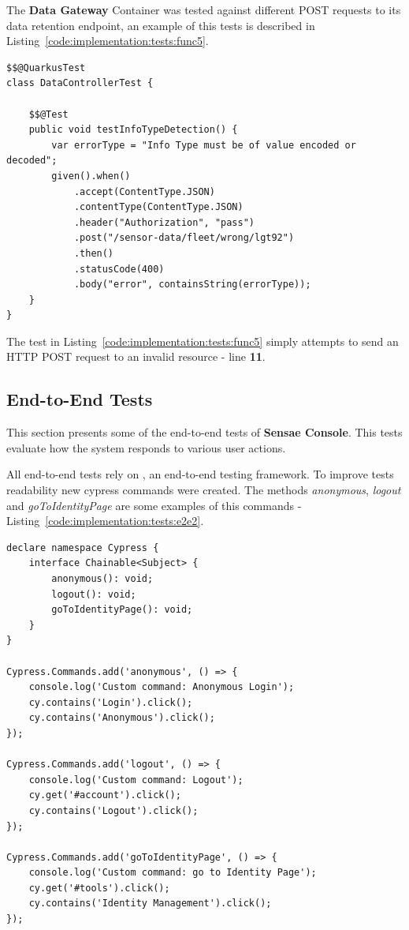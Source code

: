The \textbf{Data Gateway} Container was tested against different POST requests to its data retention endpoint, an example of this tests is described in Listing~\ref{code:implementation:tests:func5}.

\begin{lstlisting}[style=Java, caption=Functional Test - Rest Client Interaction - Data Gateway, label={code:implementation:tests:func5}]
$$@QuarkusTest
class DataControllerTest {

    $$@Test
    public void testInfoTypeDetection() {
        var errorType = "Info Type must be of value encoded or decoded";
        given().when()
            .accept(ContentType.JSON)
            .contentType(ContentType.JSON)
            .header("Authorization", "pass")
            .post("/sensor-data/fleet/wrong/lgt92")
            .then()
            .statusCode(400)
            .body("error", containsString(errorType));
    }
}
\end{lstlisting}

The test in Listing~\ref{code:implementation:tests:func5} simply attempts to send an HTTP POST request to an invalid resource - line \textbf{11}.

\subsection{End-to-End Tests}
\label{subsec:implementation:tests:endtoend}

This section presents some of the end-to-end tests of \textbf{Sensae Console}.
This tests evaluate how the system responds to various user actions.

All end-to-end tests rely on , an end-to-end testing framework.
To improve tests readability new cypress commands were created.
The methods \textit{anonymous}, \textit{logout} and \textit{goToIdentityPage} are some examples of this commands - Listing~\ref{code:implementation:tests:e2e2}.

\begin{lstlisting}[style=javascript, caption=End-to-End Test - Custom Commands - UI Aggregator, label={code:implementation:tests:e2e2}]
declare namespace Cypress {
    interface Chainable<Subject> {
        anonymous(): void;
        logout(): void;
        goToIdentityPage(): void;
    }
}

Cypress.Commands.add('anonymous', () => {
    console.log('Custom command: Anonymous Login');
    cy.contains('Login').click();
    cy.contains('Anonymous').click();
});

Cypress.Commands.add('logout', () => {
    console.log('Custom command: Logout');
    cy.get('#account').click();
    cy.contains('Logout').click();
});

Cypress.Commands.add('goToIdentityPage', () => {
    console.log('Custom command: go to Identity Page');
    cy.get('#tools').click();
    cy.contains('Identity Management').click();
});
\end{lstlisting}

